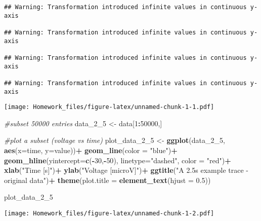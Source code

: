 \documentclass[]{article}
\newenvironment{Shaded}{\begin{snugshade}}{\end{snugshade}}
\newcommand{\KeywordTok}[1]{\textcolor[rgb]{0.13,0.29,0.53}{\textbf{#1}}}
\newcommand{\DataTypeTok}[1]{\textcolor[rgb]{0.13,0.29,0.53}{#1}}
\newcommand{\DecValTok}[1]{\textcolor[rgb]{0.00,0.00,0.81}{#1}}
\newcommand{\FloatTok}[1]{\textcolor[rgb]{0.00,0.00,0.81}{#1}}
\newcommand{\StringTok}[1]{\textcolor[rgb]{0.31,0.60,0.02}{#1}}
\newcommand{\CommentTok}[1]{\textcolor[rgb]{0.56,0.35,0.01}{\textit{#1}}}
\newcommand{\OperatorTok}[1]{\textcolor[rgb]{0.81,0.36,0.00}{\textbf{#1}}}
\newcommand{\NormalTok}[1]{#1}
\begin{document}
\begin{verbatim}
## Warning: Transformation introduced infinite values in continuous y-axis

## Warning: Transformation introduced infinite values in continuous y-axis

## Warning: Transformation introduced infinite values in continuous y-axis

## Warning: Transformation introduced infinite values in continuous y-axis
\end{verbatim}

\texttt{[image: Homework\_files/figure-latex/unnamed-chunk-1-1.pdf]}

\begin{Shaded}
\begin{Highlighting}[]
\CommentTok{#subset 50000 entries}
\NormalTok{data_2_}\DecValTok{5}\NormalTok{ <-}\StringTok{ }\NormalTok{data[}\DecValTok{1}\OperatorTok{:}\DecValTok{50000}\NormalTok{,]}

\CommentTok{#plot a subset (voltage vs time)}
\NormalTok{plot_data_2_}\DecValTok{5}\NormalTok{ <-}\StringTok{ }\KeywordTok{ggplot}\NormalTok{(data_2_}\DecValTok{5}\NormalTok{, }\KeywordTok{aes}\NormalTok{(}\DataTypeTok{x=}\NormalTok{time, }\DataTypeTok{y=}\NormalTok{value))}\OperatorTok{+}
\StringTok{  }\KeywordTok{geom_line}\NormalTok{(}\DataTypeTok{color =} \StringTok{"blue"}\NormalTok{)}\OperatorTok{+}
\StringTok{  }\KeywordTok{geom_hline}\NormalTok{(}\DataTypeTok{yintercept=}\KeywordTok{c}\NormalTok{(}\OperatorTok{-}\DecValTok{30}\NormalTok{,}\OperatorTok{-}\DecValTok{50}\NormalTok{), }\DataTypeTok{linetype=}\StringTok{"dashed"}\NormalTok{, }\DataTypeTok{color =} \StringTok{"red"}\NormalTok{)}\OperatorTok{+}
\StringTok{  }\KeywordTok{xlab}\NormalTok{(}\StringTok{"Time [s]"}\NormalTok{)}\OperatorTok{+}
\StringTok{  }\KeywordTok{ylab}\NormalTok{(}\StringTok{"Voltage [microV]"}\NormalTok{)}\OperatorTok{+}
\StringTok{  }\KeywordTok{ggtitle}\NormalTok{(}\StringTok{"A 2.5s example trace - original data"}\NormalTok{)}\OperatorTok{+}
\StringTok{  }\KeywordTok{theme}\NormalTok{(}\DataTypeTok{plot.title =} \KeywordTok{element_text}\NormalTok{(}\DataTypeTok{hjust =} \FloatTok{0.5}\NormalTok{))}

\NormalTok{plot_data_2_}\DecValTok{5}
\end{Highlighting}
\end{Shaded}

\texttt{[image: Homework\_files/figure-latex/unnamed-chunk-1-2.pdf]}
\end{document}
